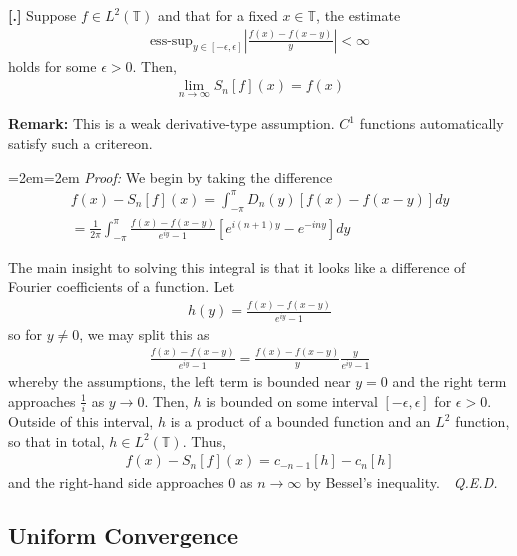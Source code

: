 \documentclass{article}
\newcommand{\bT}{\mathbb{T}}
\newcounter{result}[section]
\newenvironment{res}[1][]{\refstepcounter{result}\par\medskip
	\noindent \textbf{[\thesection.\theresult] #1} \rmfamily}{\medskip}
\newenvironment{pf}{%
	\par%
	\medskip
	\leftskip=2em\rightskip=2em%
	\noindent\ignorespaces \textit{Proof:} \newline}{%
	\,\, \newline \textit{Q.E.D.}\par\medskip}
\begin{document}
	
	\begin{res}
		Suppose $f \in L^{2}(\bT)$ and that for a fixed $x \in \bT$, the estimate 
		\begin{align*}
			\text{ess-sup}_{y \in [-\epsilon, \epsilon]} \left| \frac{f(x) - f(x-y)}{y}\right| < \infty
		\end{align*}
		holds for some $\epsilon > 0$. Then,
		\begin{align*}
			\lim_{n \to \infty} S_{n}[f](x) = f(x)
		\end{align*}
	\end{res} 
	
	\textbf{Remark:} This is a weak derivative-type assumption. $C^{1}$ functions automatically satisfy such a critereon. 
	
	\begin{pf}
		We begin by taking the difference
		\begin{align*}
			f(x) - S_{n}[f](x) = \int_{-\pi}^{\pi} D_{n}(y) [f(x)-f(x-y)] dy \\
			= \frac{1}{2\pi} \int_{-\pi}^{\pi} \frac{f(x)-f(x-y)}{e^{iy}-1} \left[ e^{i(n+1)y} - e^{-iny}\right] dy
		\end{align*}
		
		The main insight to solving this integral is that it looks like a difference of Fourier coefficients of a function. Let 
		\begin{align*}
			h(y) = \frac{f(x)-f(x-y)}{e^{iy}-1} 
		\end{align*}
		so for $y \neq 0$, we may split this as 
		\begin{align*}
			\frac{f(x)-f(x-y)}{e^{iy}-1} =\frac{f(x)-f(x-y)}{y} \frac{y}{e^{iy}-1} 
		\end{align*}
		whereby the assumptions, the left term is bounded near $y=0$ and the right term approaches $\frac{1}{i}$ as $y \to 0$. Then, $h$ is bounded on some interval $[-\epsilon,\epsilon]$ for $\epsilon > 0$. Outside of this interval, $h$ is a product of a bounded function and an $L^{2}$ function, so that in total, $h \in L^{2}(\bT)$. Thus,
		\begin{align*}
			f(x) -S_{n}[f](x) = c_{-n-1}[h] - c_{n}[h]
		\end{align*}
		and the right-hand side approaches $0$ as $n \to \infty$ by Bessel's inequality.
	\end{pf}
	
	
	\subsection{Uniform Convergence}
	
\end{document}
